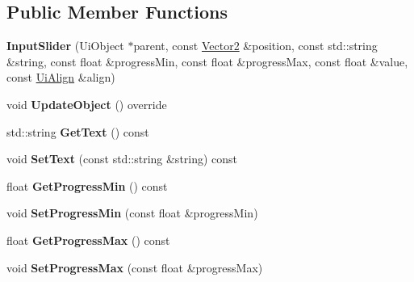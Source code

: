 \subsection*{Public Member Functions}
\begin{DoxyCompactItemize}
\item 
\mbox{\label{class_flounder_1_1_input_slider_adef7dc6b6c892cd7c035d6bae8df7dbe}} 
{\bfseries Input\+Slider} (Ui\+Object $\ast$parent, const \hyperlink{class_flounder_1_1_vector2}{Vector2} \&position, const std\+::string \&string, const float \&progress\+Min, const float \&progress\+Max, const float \&value, const \hyperlink{namespace_flounder_a561db2012ae4152be62bcd882407d361}{Ui\+Align} \&align)
\item 
\mbox{\label{class_flounder_1_1_input_slider_a2931cc13e437bc52b3f17aab07519c4d}} 
void {\bfseries Update\+Object} () override
\item 
\mbox{\label{class_flounder_1_1_input_slider_a2b34dcf581cf27ff7fb63317e309d845}} 
std\+::string {\bfseries Get\+Text} () const
\item 
\mbox{\label{class_flounder_1_1_input_slider_aed494cd4f0574230bcca4589947893df}} 
void {\bfseries Set\+Text} (const std\+::string \&string) const
\item 
\mbox{\label{class_flounder_1_1_input_slider_a5f1b96f12880fa1768ce602a6ba5ba3e}} 
float {\bfseries Get\+Progress\+Min} () const
\item 
\mbox{\label{class_flounder_1_1_input_slider_a539bf779d2c36b3e4481c8fa8460f9cf}} 
void {\bfseries Set\+Progress\+Min} (const float \&progress\+Min)
\item 
\mbox{\label{class_flounder_1_1_input_slider_a7f04d0d7d0a12b491723e922086016e0}} 
float {\bfseries Get\+Progress\+Max} () const
\item 
\mbox{\label{class_flounder_1_1_input_slider_a8a6cffd3a034de1a845de3c1ec99dc49}} 
void {\bfseries Set\+Progress\+Max} (const float \&progress\+Max)

\end{DoxyCompactItemize}
